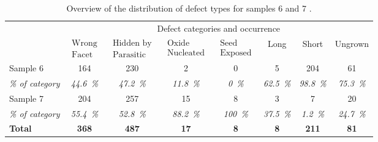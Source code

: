 \begin{table}
    \centering
    \caption[Overview of the distribution of defect types for samples 6 and 7.]{Overview of the distribution of defect types for samples 6 and 7 \cite{Brugnolotto2023_2}.}
    \begin{tabular}{l|ccccccc}
        \hline
         & \multicolumn{7}{c}{Defect categories and occurrence} \\ 
         & $\begin{matrix} \text{Wrong} \\ \text{Facet} \end{matrix}$ & $\begin{matrix} \text{Hidden by} \\ \text{Parasitic} \end{matrix}$ & $\begin{matrix} \text{Oxide} \\ \text{Nucleated} \end{matrix}$ & $\begin{matrix} \text{Seed} \\ \text{Exposed} \end{matrix}$ & Long & Short & Ungrown \\ 
        \hline \hline
        Sample 6 & \num{164} & \num{230} & \num{2} & \num{0} & \num{5} & \num{204} & \num{61} \\ 
        \textit{\% of category} & \textit{\qty{44.6}{\%}} & \textit{\qty{47.2}{\%}} & \textit{\qty{11.8}{\%}} & \textit{\qty{0}{\percent}} & \textit{\qty{62.5}{\%}} & \textit{\qty{98.8}{\%}} & \textit{\qty{75.3}{\%}} \\ 
        \hline
        Sample 7 & \num{204} & \num{257} & \num{15} & \num{8} & \num{3} & \num{7} & \num{20} \\ 
        \textit{\% of category} & \textit{\qty{55.4}{\%}} & \textit{\qty{52.8}{\%}} & \textit{\qty{88.2}{\%}} & \textit{\qty{100}{\%}} & \textit{\qty{37.5}{\%}} & \textit{\qty{1.2}{\%}} & \textit{\qty{24,7}{\%}} \\ 
        \hline
        \textbf{Total} & \textbf{\num{368}} & \textbf{\num{487}} & \textbf{\num{17}} & \textbf{\num{8}} & \textbf{\num{8}} & \textbf{\num{211}} & \textbf{\num{81}} \\
        \hline
    \end{tabular}
    \label{tab:defects_overview}
\end{table}

